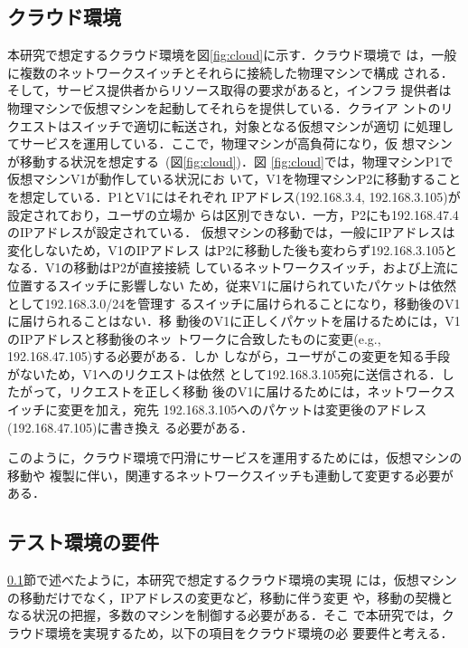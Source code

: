 \documentclass[submit,techrep]{ipsj}
\begin{document}
\subsection{クラウド環境}
\label{subsec:cloud}
本研究で想定するクラウド環境を図\ref{fig:cloud}に示す．クラウド環境で
は，一般に複数のネットワークスイッチとそれらに接続した物理マシンで構成
される．そして，サービス提供者からリソース取得の要求があると，インフラ
提供者は物理マシンで仮想マシンを起動してそれらを提供している．クライア
ントのリクエストはスイッチで適切に転送され，対象となる仮想マシンが適切
に処理してサービスを運用している．ここで，物理マシンが高負荷になり，仮
想マシンが移動する状況を想定する~(図\ref{fig:cloud})．図
\ref{fig:cloud}では，物理マシンP1で仮想マシンV1が動作している状況にお
いて，V1を物理マシンP2に移動することを想定している．P1とV1にはそれぞれ
IPアドレス(192.168.3.4, 192.168.3.105)が設定されており，ユーザの立場か
らは区別できない．一方，P2にも192.168.47.4のIPアドレスが設定されている．
仮想マシンの移動では，一般にIPアドレスは変化しないため，V1のIPアドレス
はP2に移動した後も変わらず192.168.3.105となる．V1の移動はP2が直接接続
しているネットワークスイッチ，および上流に位置するスイッチに影響しない
ため，従来V1に届けられていたパケットは依然として192.168.3.0/24を管理す
るスイッチに届けられることになり，移動後のV1に届けられることはない．移
動後のV1に正しくパケットを届けるためには，V1のIPアドレスと移動後のネッ
トワークに合致したものに変更(e.g., 192.168.47.105)する必要がある．しか
しながら，ユーザがこの変更を知る手段がないため，V1へのリクエストは依然
として192.168.3.105宛に送信される．したがって，リクエストを正しく移動
後のV1に届けるためには，ネットワークスイッチに変更を加え，宛先
192.168.3.105へのパケットは変更後のアドレス(192.168.47.105)に書き換え
る必要がある．

このように，クラウド環境で円滑にサービスを運用するためには，仮想マシンの移動や
複製に伴い，関連するネットワークスイッチも連動して変更する必要がある．

\subsection{テスト環境の要件}\label{subsec:requirement}
\ref{subsec:cloud}節で述べたように，本研究で想定するクラウド環境の実現
には，仮想マシンの移動だけでなく，IPアドレスの変更など，移動に伴う変更
や，移動の契機となる状況の把握，多数のマシンを制御する必要がある．そこ
で本研究では，クラウド環境を実現するため，以下の項目をクラウド環境の必
要要件と考える．
\end{document}
